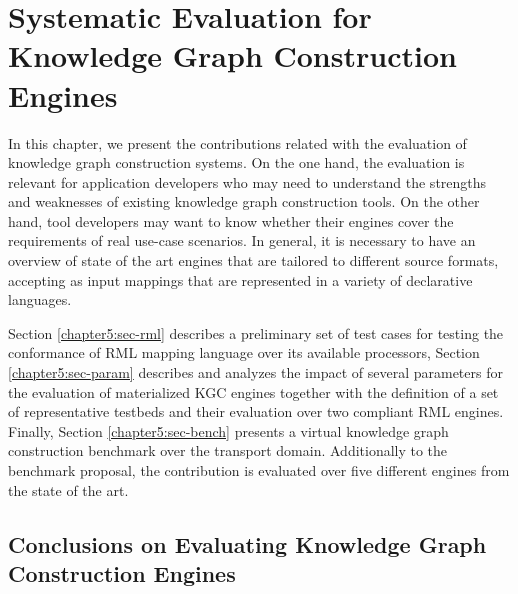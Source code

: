 \chapter{Systematic Evaluation for Knowledge Graph Construction Engines}
\label{chapter:evaluation}
In this chapter, we present the contributions related with the evaluation of knowledge graph construction systems. On the one hand, the evaluation is relevant for application developers who may need to understand the strengths and weaknesses of existing knowledge graph construction tools. On the other hand, tool developers may want to know whether their engines cover the requirements of real use-case scenarios. In general, it is necessary to have an overview of state of the art engines that are tailored to different source formats, accepting as input mappings that are represented in a variety of declarative languages. 

 Section \ref{chapter5:sec-rml} describes a preliminary set of test cases for testing the conformance of RML mapping language over its available processors, Section \ref{chapter5:sec-param} describes and analyzes the impact of several parameters for the evaluation of materialized KGC engines together with the definition of a set of representative testbeds and their evaluation over two compliant RML engines. Finally, Section \ref{chapter5:sec-bench} presents a virtual knowledge graph construction benchmark over the transport domain. Additionally to the benchmark proposal, the contribution is evaluated over five different engines from the state of the art.








\section{Conclusions on Evaluating Knowledge Graph Construction Engines}
